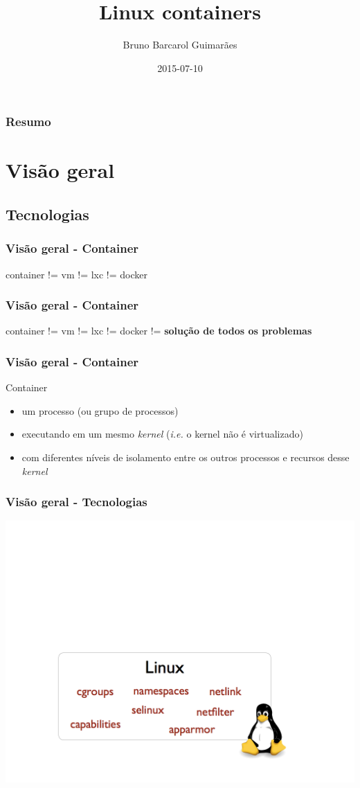 \documentclass{beamer}
\title[Linux containers]{Linux containers}
\author{Bruno Barcarol Guimarães}
\institute[]{\textit{bbgstb@gmail.com}}
\date{2015-07-10}
\begin{document}
\begin{frame}
    \titlepage
\end{frame}

\begin{frame}
    \frametitle{Resumo}
    \tableofcontents
\end{frame}

\section{Visão geral}

\subsection{Tecnologias}

\begin{frame}
    \frametitle{Visão geral - Container}
    container != vm != lxc != docker
\end{frame}

\begin{frame}
    \frametitle{Visão geral - Container}
    container != vm != lxc != docker != \textbf{solução de todos os problemas}
\end{frame}

\begin{frame}
    \frametitle{Visão geral - Container}
    Container
    \begin{itemize}
        \item um processo (ou grupo de processos)
        \item executando em um mesmo \textit{kernel} (\textit{i.e.} o kernel
        não é virtualizado)
        \item com diferentes níveis de isolamento entre os outros processos e
        recursos desse \textit{kernel}
    \end{itemize}
\end{frame}

\begin{frame}
    \frametitle{Visão geral - Tecnologias}
    \centering
    \includegraphics[width=1\linewidth]{img/docker_diagram_kernel.png}
\end{frame}
\end{document}
